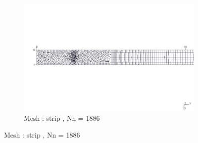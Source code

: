\documentclass[9pt]{beamer}
\begin{document}
\begin{frame}
\begin{figure}[h!]
\begin{subfigure}{1\textwidth}
\end{subfigure} \vfill

\begin{subfigure}{1\textwidth}

\includegraphics[width=\linewidth,trim={0cm 9cm 0cm 9cm},clip]{Mesh_Dependency/meshes/strip.png}
\caption{Mesh : strip , Nn = 1886 }

\end{subfigure} 


\end{figure}
\end{frame}

\end{document}
